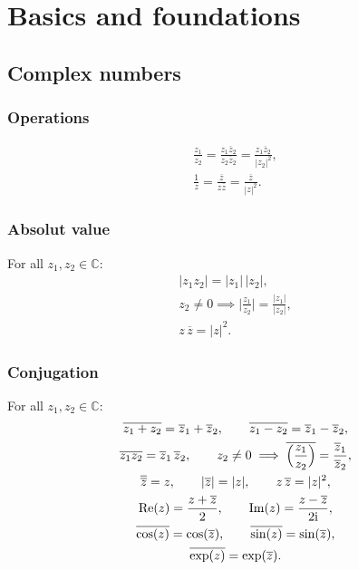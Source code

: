 
\chapter{Basics and foundations}
\section{Complex numbers}
\subsection{Operations}

\begin{gather}
\frac{z_1}{z_2}
= \frac{z_1\overline z_2}{z_2\overline z_2}
= \frac{z_1\overline z_2}{|z_2|^2},\\
\frac{1}{z} = \frac{\overline z}{z\overline z}
= \frac{\overline z}{|z|^2}.
\end{gather}

\subsection{Absolut value}
For all $z_1,z_2\in\mathbb C$:
\begin{gather}
|z_1z_2| = |z_1|\,|z_2|,\\
z_2\ne 0\implies \Big|\frac{z_1}{z_2}\Big|
= \frac{|z_1|}{|z_2|},\\
z\,\overline z = |z|^2.
\end{gather}

\subsection{Conjugation}
For all $z_1,z_2\in\mathbb C$:
\begin{gather}
\overline{z_1+z_2} = \overline z_1+\overline z_2,\qquad
\overline{z_1-z_2} = \overline z_1-\overline z_2,\\
\overline{z_1 z_2} = \overline z_1\,\overline z_2,\qquad
z_2\ne 0 \implies \overline{\Big(\frac{z_1}{z_2}\Big)}
= \frac{\overline z_1}{\overline z_2},\\
\overline{\overline z}=z,\qquad
|\overline{z}| = |z|,\qquad
z\,\overline z = |z|^2,\\
\operatorname{Re}(z) = \frac{z+\overline z}{2},\qquad
\operatorname{Im}(z) = \frac{z-\overline z}{2\mathrm i},\\
\overline{\cos(z)} = \cos(\overline z),\qquad
\overline{\sin(z)} = \sin(\overline z),\\
\overline{\exp(z)} = \exp(\overline z).
\end{gather}

